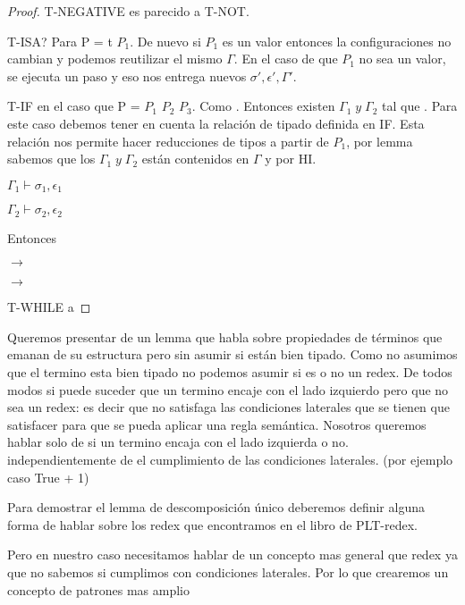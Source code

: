 \begin{proof}
T-NEGATIVE es parecido a T-NOT.

T-ISA? Para P =  t $P_{1}$. De nuevo si $P_{1}$ es un valor entonces la configuraciones no cambian y podemos reutilizar el mismo $\Gamma$.
En el caso de que $P_{1}$ no sea un valor, se ejecuta un paso y eso nos entrega nuevos $\sigma', \epsilon', \Gamma'$.

T-IF en el caso que P =  $P_{1}$  $P_{2}$  $P_{3}$. Como .
Entonces existen $\Gamma_{1} \; y \; \Gamma_{2}$ tal que .
 Para este caso debemos tener en cuenta la relación de tipado
definida en IF. Esta relación nos permite hacer reducciones de tipos a partir de $P_{1}$, por lemma sabemos que los $\Gamma_{1} \; y \; \Gamma_{2}$
están contenidos en $\Gamma$ y por HI.

$\Gamma_{1} \vdash \sigma_{1}, \epsilon_{1}$

$\Gamma_{2} \vdash \sigma_{2}, \epsilon_{2}$

Entonces 

  $\rightarrow$ 

  $\rightarrow$ 

T-WHILE a

\end{proof}

Queremos presentar de un lemma que habla sobre propiedades de términos que emanan de su estructura pero sin asumir si están bien tipado.
Como no asumimos que el termino esta bien tipado no podemos asumir si es o no un redex.
De todos modos si puede suceder que un termino encaje con el lado izquierdo pero  que no sea un redex:
 es decir que no satisfaga las condiciones laterales que se tienen que satisfacer para que se pueda aplicar una regla semántica.
Nosotros queremos hablar solo de si un termino encaja con el lado izquierda o no. independientemente de el cumplimiento de las condiciones laterales.
(por ejemplo caso True + 1)

Para demostrar el lemma de descomposición único deberemos definir alguna forma de hablar sobre los redex que encontramos en el libro de PLT-redex.

Pero en nuestro caso necesitamos hablar de un concepto mas general que redex ya que no sabemos si cumplimos con condiciones laterales.
Por lo que crearemos un concepto de patrones mas amplio

